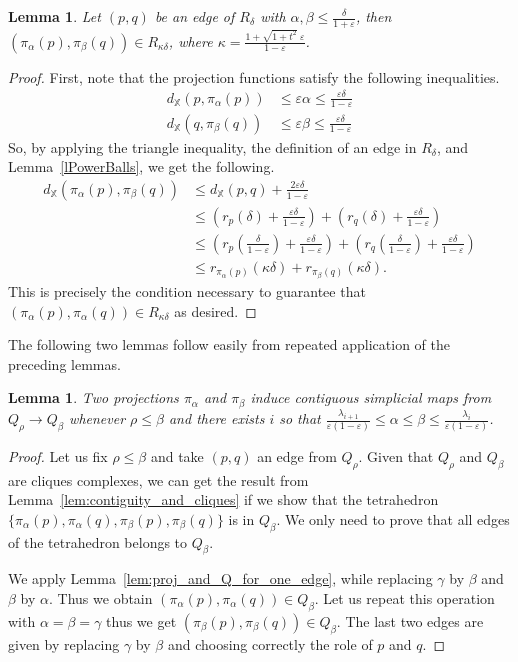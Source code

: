 \documentclass[a4paper]{article}
\newcommand\X{\mathbb{X}}
\newcommand\dX[2]{d_\X(#1,#2)}
\newtheorem{lemma}[theorem]{Lemma}
\newcommand{\e}{\varepsilon}
\newcommand{\ir}{\lambda}
\newcommand{\proj}{\pi}
\begin{document}
  \begin{lemma}\label{lem:proj_and_R_for_one_edge}
Let $(p,q)$ be an edge of $R_\delta$ with $\alpha, \beta \le \frac{\delta}{1+\e}$, then $(\proj_\alpha(p), \proj_\beta(q))\in R_{\kappa\delta}$, where $\kappa= \frac{1 + \sqrt{1+t^2}\;\e}{1-\e}$.
  \end{lemma}
  \begin{proof}
    First, note that the projection functions satisfy the following inequalities.
    \begin{align*}
      \dX{p}{\proj_\alpha(p)} &\le \e \alpha \le \frac{\e \delta}{1-\e} \\
      \dX{q}{\proj_\beta(q)} &\le \e \beta \le \frac{\e \delta}{1-\e}
    \end{align*}
    So, by applying the triangle inequality, the definition of an edge in $R_\delta$, and Lemma~\ref{lPowerBalls}, we get the following.
    \begin{align*}
      \dX{\proj_\alpha(p)}{\proj_\beta(q)} 
        &\le \dX{p}{q} + \frac{2\e\delta}{1-\e}\\
        &\le \left(r_p(\delta) + \frac{\e\delta}{1-\e}\right) + \left(r_q(\delta) + \frac{\e\delta}{1-\e}\right)\\
        &\le \left(r_p\left(\frac{\delta}{1-\e}\right) + \frac{\e\delta}{1-\e}\right) + \left(r_q\left(\frac{\delta}{1-\e}\right) + \frac{\e\delta}{1-\e}\right)\\
        &\le r_{\proj_\alpha(p)}(\kappa\delta) + r_{\proj_\beta(q)}(\kappa\delta).
    \end{align*}
    This is precisely the condition necessary to guarantee that $(\proj_\alpha(p), \proj_\alpha(q))\in R_{\kappa \delta}$ as desired.
  \end{proof}

  The following two lemmas follow easily from repeated application of the preceding lemmas.

  \begin{lemma}\label{lem:proj_and_Q}
    Two projections $\proj_\alpha$ and $\proj_\beta$ induce contiguous simplicial maps from $Q_\rho\to Q_\beta$ whenever $\rho \le \beta$ and there exists $i$ so that $\frac{\ir_{i+1}}{\e(1-\e)}\le \alpha \le \beta \le \frac{\ir_{i}}{\e(1-\e)}$.
  \end{lemma}
  
\begin{proof}
Let us fix $\rho\leq\beta$ and take $(p,q)$ an edge from $Q_\rho$. 
Given that $Q_\rho$ and $Q_\beta$ are cliques complexes, we can get the result from Lemma~\ref{lem:contiguity_and_cliques} if we show that the tetrahedron $\{\proj_\alpha(p),\proj_\alpha(q),\proj_\beta(p),\proj_\beta(q)\}$ is in $Q_\beta$.
We only need to prove that all edges of the tetrahedron belongs to $Q_\beta$.

We apply Lemma~\ref{lem:proj_and_Q_for_one_edge}, while replacing $\gamma$ by $\beta$ and $\beta$ by $\alpha$. Thus we obtain $(\proj_\alpha(p),\proj_\alpha(q))\in Q_\beta$.
Let us repeat this operation with $\alpha=\beta=\gamma$ thus we get $(\proj_\beta(p),\proj_\beta(q))\in Q_\beta$.
The last two edges are given by replacing $\gamma$ by $\beta$ and choosing correctly the role of $p$ and $q$.
\end{proof}
\end{document}
